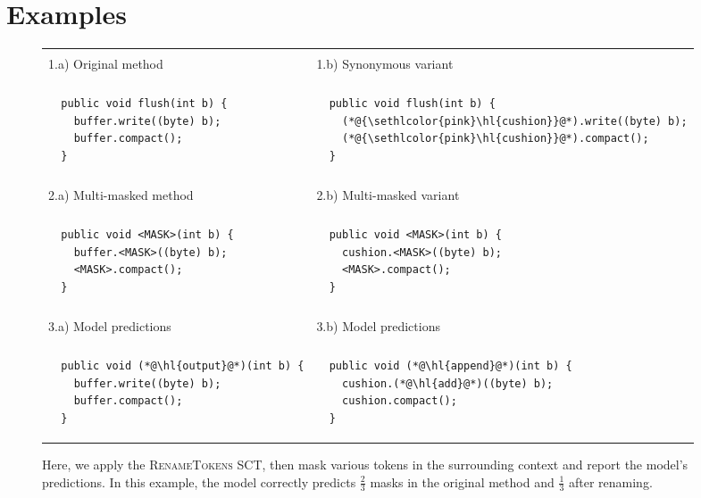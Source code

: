 \documentclass[usenames,dvipsnames]{article} %
\DeclareRobustCommand{\hlred}[1]{{\sethlcolor{pink}\hl{#1}}}
\begin{document}
  \section{Examples}\label{sec:examples}



  \begin{figure}[H]
    \begin{center}
      \begin{tabular}{|p{5cm}|p{5cm}|}
        \hline\\[-1em]1.a) Original method  &  1.b) Synonymous variant\\[-1em]\\\hline
        \begin{lstlisting}
  public void flush(int b) {
    buffer.write((byte) b);
    buffer.compact();
  }
        \end{lstlisting} & \begin{lstlisting}
  public void flush(int b) {
    (*@\hlred{cushion}@*).write((byte) b);
    (*@\hlred{cushion}@*).compact();
  }
        \end{lstlisting}
        \\\hline\\[-1em]2.a) Multi-masked method   &  2.b) Multi-masked variant\\[-1em]\\\hline
        \begin{lstlisting}
  public void <MASK>(int b) {
    buffer.<MASK>((byte) b);
    <MASK>.compact();
  }
        \end{lstlisting} & \begin{lstlisting}
  public void <MASK>(int b) {
    cushion.<MASK>((byte) b);
    <MASK>.compact();
  }
        \end{lstlisting}
        \\\hline\\[-1em]3.a) Model predictions  &  3.b) Model predictions\\[-1em]\\\hline
        \begin{lstlisting}
  public void (*@\hl{output}@*)(int b) {
    buffer.write((byte) b);
    buffer.compact();
  }
        \end{lstlisting} & \begin{lstlisting}
  public void (*@\hl{append}@*)(int b) {
    cushion.(*@\hl{add}@*)((byte) b);
    cushion.compact();
  }
        \end{lstlisting} \\\hline
      \end{tabular}
    \end{center}
    \caption{Here, we apply the \textsc{RenameTokens} SCT, then mask various tokens in the surrounding context and report the model's predictions. In this example, the model correctly predicts $\frac{2}{3}$ masks in the original method and $\frac{1}{3}$ after renaming.}
    \label{fig:code_completion}
  \end{figure}
\end{document}
